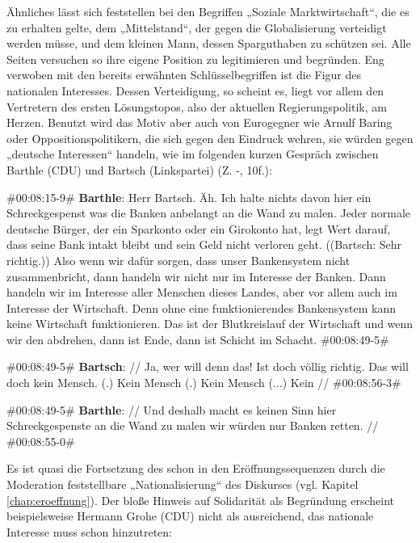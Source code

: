 Ähnliches lässt sich feststellen bei den Begriffen „Soziale Marktwirtschaft“, die es zu erhalten gelte, dem „Mittelstand“, der gegen die Globalisierung verteidigt werden müsse, und dem kleinen Mann, dessen Sparguthaben zu schützen sei. Alle Seiten versuchen so ihre eigene Position zu legitimieren und begründen. Eng verwoben mit den bereits erwähnten Schlüsselbegriffen ist die Figur des nationalen Interesses. Dessen Verteidigung, so scheint es, liegt vor allem den Vertretern des ersten Lösungstopos, also der aktuellen Regierungspolitik, am Herzen. Benutzt wird das Motiv aber auch von Eurogegner wie Arnulf Baring oder Oppositionspolitikern, die sich gegen den Eindruck wehren, sie würden gegen „deutsche Interessen“ handeln, wie im folgenden kurzen Gespräch zwischen Barthle (CDU) und Bartsch (Linkspartei) (Z. -, 10f.):

\begin{description}
	\begin{linenumbers}[1]
		\item \#00:08:15-9\# \textbf{Barthle}: Herr Bartsch. Äh. Ich halte nichts davon hier ein Schreckgespenst was die Banken anbelangt an die Wand zu malen. Jeder normale deutsche Bürger, der ein Sparkonto oder ein Girokonto hat, legt Wert darauf, dass seine Bank intakt bleibt und sein Geld nicht verloren geht. ((Bartsch: Sehr richtig.)) Also wenn wir dafür sorgen, dass unser Bankensystem nicht zusammenbricht, dann handeln wir nicht nur im Interesse der Banken. Dann handeln wir im Interesse aller Menschen dieses Landes, aber vor allem auch im Interesse der Wirtschaft. Denn ohne eine funktionierendes Bankensystem kann keine Wirtschaft funktionieren. Das ist der Blutkreislauf der Wirtschaft und wenn wir den abdrehen, dann ist Ende, dann ist Schicht im Schacht. \#00:08:49-5\#
		
		\item \#00:08:49-5\# \textbf{Bartsch}: // Ja, wer will denn das! Ist doch völlig richtig. Das will doch kein Mensch. (.) Kein Mensch (.) Kein Mensch ($\ldots$) Kein // \#00:08:56-3\# 
		
		\item \#00:08:49-5\# \textbf{Barthle}: // Und deshalb macht es keinen Sinn hier Schreckgespenste an die Wand zu malen wir würden nur Banken retten. // \#00:08:55-0\# 
	\end{linenumbers}
\end{description}

Es ist quasi die Fortsetzung des schon in den Eröffnungssequenzen durch die Moderation feststellbare „Nationalisierung“ des Diskurses (vgl. Kapitel \vref{chap:eroeffnung}). Der bloße Hinweis auf Solidarität als Begründung erscheint beispielsweise Hermann Grohe (CDU) nicht als ausreichend, das nationale Interesse muss schon hinzutreten:

